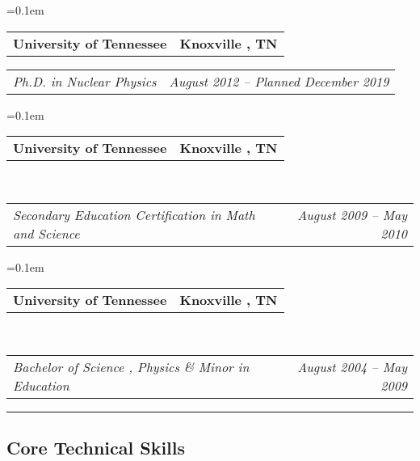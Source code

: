 \documentclass[12pt,letterpaper]{article}
\makeatletter
\newcommand{\headerrow}[2]
{\begin{tabular*}{\linewidth}{l@{\extracolsep{\fill}}r}
	#1 &
	#2 \\
\end{tabular*}}
\makeatother
\begin{document}
\begin{itemize*}
	\parskip=0.1em

	\item 
	\headerrow
		{\textbf{University of Tennessee}}
		{\textbf{Knoxville , TN}}
	
	\headerrow
		{\emph{Ph.D. in Nuclear Physics}}
		{\emph{August 2012 -- Planned December 2019}}


	\parskip=0.1em
	
	\item 
	\headerrow
	{\textbf{University of Tennessee}}
	{\textbf{Knoxville , TN}}
	\\
	\headerrow
	{\emph{Secondary Education Certification in Math and Science}}
	{\emph{August 2009 -- May 2010}}
	

	\parskip=0.1em
	
	\item 
	\headerrow
	{\textbf{University of Tennessee}}
	{\textbf{Knoxville , TN}}
	\\
	\headerrow
	{\emph{Bachelor of Science , Physics \& Minor in Education }}
	{\emph{August 2004 -- May 2009}}

	
\end{itemize*}


\hrule
\vspace{-0.4em}
\subsection*{Core Technical Skills}
\end{document}
